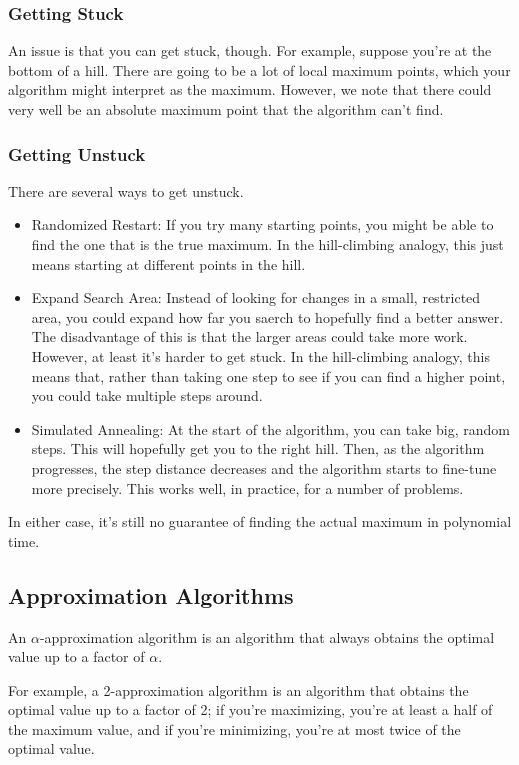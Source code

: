 \documentclass[letterpaper]{article}
\begin{document}
\subsubsection{Getting Stuck}
An issue is that you can get stuck, though. For example, suppose you're at the bottom of a hill. There are going to be a lot of local maximum points, which your algorithm might interpret as the maximum. However, we note that there could very well be an absolute maximum point that the algorithm can't find. 

\subsubsection{Getting Unstuck}
There are several ways to get unstuck. 
\begin{itemize}
    \item Randomized Restart: If you try many starting points, you might be able to find the one that is the true maximum. In the hill-climbing analogy, this just means starting at different points in the hill. 
    \item Expand Search Area: Instead of looking for changes in a small, restricted area, you could expand how far you saerch to hopefully find a better answer. The disadvantage of this is that the larger areas could take more work. However, at least it's harder to get stuck. In the hill-climbing analogy, this means that, rather than taking one step to see if you can find a higher point, you could take multiple steps around. 
    \item Simulated Annealing: At the start of the algorithm, you can take big, random steps. This will hopefully get you to the right hill. Then, as the algorithm progresses, the step distance decreases and the algorithm starts to fine-tune more precisely. This works well, in practice, for a number of problems. 
\end{itemize}
In either case, it's still no guarantee of finding the actual maximum in polynomial time. 


\subsection{Approximation Algorithms}
An $\alpha$-approximation algorithm is an algorithm that always obtains the optimal value up to a factor of $\alpha$. 

\bigskip 

For example, a 2-approximation algorithm is an algorithm that obtains the optimal value up to a factor of 2; if you're maximizing, you're at least a half of the maximum value, and if you're minimizing, you're at most twice of the optimal value. 
\end{document}
